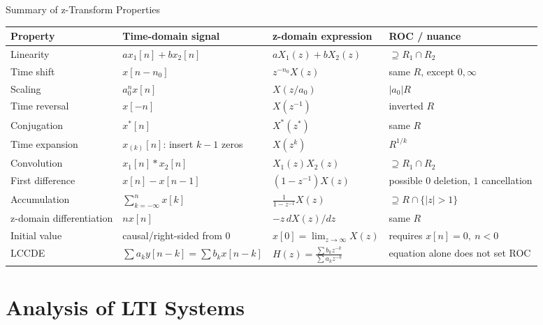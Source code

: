 \begin{frame}[t]{Summary of z-Transform Properties}
  \scriptsize
  \centering
  \begingroup
  \setlength{\tabcolsep}{3pt}
  \renewcommand{\arraystretch}{1.28}
  \begin{tabular}{>{\raggedright\arraybackslash}p{}
      >{\raggedright\arraybackslash}p{}
      >{\raggedright\arraybackslash}p{}
    >{\raggedright\arraybackslash}p{}}
    \toprule
    Property & Time-domain signal & z-domain expression & ROC / nuance \\
    \midrule
    Linearity
    & $a x_1[n]+b x_2[n]$
    & $aX_1(z)+bX_2(z)$
    & $\supseteq R_1\cap R_2$ \\
    Time shift
    & $x[n-n_0]$
    & $z^{-n_0}X(z)$
    & same $R$, except $0,\infty$ \\
    Scaling
    & $a_0^n x[n]$
    & $X(z/a_0)$
    & $|a_0|R$ \\
    Time reversal
    & $x[-n]$
    & $X(z^{-1})$
    & inverted $R$ \\
    Conjugation
    & $x^*[n]$
    & $X^*(z^*)$
    & same $R$ \\
    Time expansion
    & $x_{(k)}[n]$: insert $k-1$ zeros
    & $X(z^k)$
    & $R^{1/k}$ \\
    Convolution
    & $x_1[n]*x_2[n]$
    & $X_1(z)X_2(z)$
    & $\supseteq R_1\cap R_2$ \\
    First difference
    & $x[n]-x[n-1]$
    & $(1-z^{-1})X(z)$
    & possible $0$ deletion, $1$ cancellation \\
    Accumulation
    & $\sum_{k=-\infty}^{n}x[k]$
    & $\frac{1}{1-z^{-1}}X(z)$
    & $\supseteq R\cap\{|z|>1\}$ \\
    z-domain differentiation
    & $n x[n]$
    & $-z\,dX(z)/dz$
    & same $R$ \\
    Initial value
    & causal/right-sided from $0$
    & $x[0]=\lim_{z\to\infty}X(z)$
    & requires $x[n]=0,\ n<0$ \\
    LCCDE
    & $\sum a_k y[n-k]=\sum b_k x[n-k]$
    & $H(z)=\frac{\sum b_k z^{-k}}{\sum a_k z^{-k}}$
    & equation alone does not set ROC \\
    \bottomrule
  \end{tabular}
  \endgroup
\end{frame}

\section{Analysis of LTI Systems}

